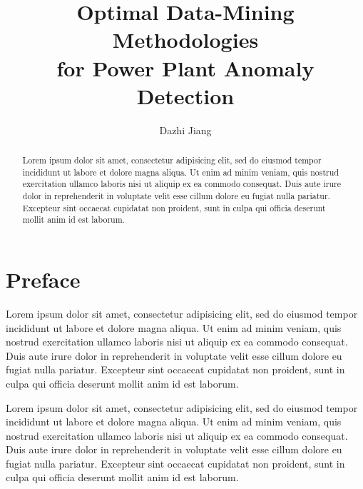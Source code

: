 \documentclass[10pt,a4paper,extrafontsizes,oldfontcommands,oneside]{memoir}
\author{Dazhi Jiang}
\title{Optimal Data-Mining Methodologies\\[10pt]
	for Power Plant Anomaly Detection}
\begin{document}
\frontmatter

\maketitle

\maketitle

\maketitle

\begin{abstract}
Lorem ipsum dolor sit amet, consectetur adipisicing elit, sed do eiusmod tempor incididunt ut labore et dolore magna aliqua. Ut enim ad minim veniam, quis nostrud exercitation ullamco laboris nisi ut aliquip ex ea commodo consequat. Duis aute irure dolor in reprehenderit in voluptate velit esse cillum dolore eu fugiat nulla pariatur. Excepteur sint occaecat cupidatat non proident, sunt in culpa qui officia deserunt mollit anim id est laborum.

\end{abstract}


\chapter*{Preface}
Lorem ipsum dolor sit amet, consectetur adipisicing elit, sed do eiusmod tempor incididunt ut labore et dolore magna aliqua. Ut enim ad minim veniam, quis nostrud exercitation ullamco laboris nisi ut aliquip ex ea commodo consequat. Duis aute irure dolor in reprehenderit in voluptate velit esse cillum dolore eu fugiat nulla pariatur. Excepteur sint occaecat cupidatat non proident, sunt in culpa qui officia deserunt mollit anim id est laborum.

Lorem ipsum dolor sit amet, consectetur adipisicing elit, sed do eiusmod tempor incididunt ut labore et dolore magna aliqua. Ut enim ad minim veniam, quis nostrud exercitation ullamco laboris nisi ut aliquip ex ea commodo consequat. Duis aute irure dolor in reprehenderit in voluptate velit esse cillum dolore eu fugiat nulla pariatur. Excepteur sint occaecat cupidatat non proident, sunt in culpa qui officia deserunt mollit anim id est laborum.
\end{document}
